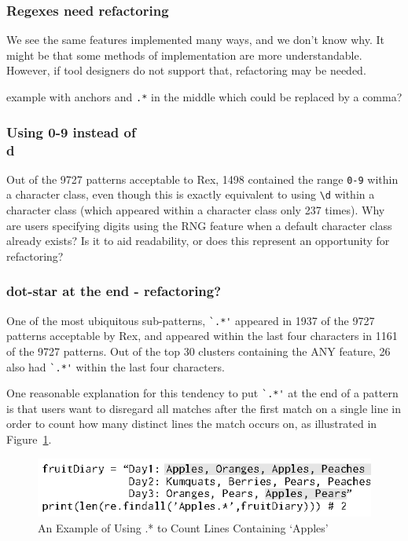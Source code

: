 \subsubsection{Regexes need refactoring}
We see the same features implemented many ways, and we don't know why. It might be that some methods of implementation are more understandable. However, if tool designers do not support that, refactoring may be needed.

example with anchors and {\tt .*} in the middle which could be replaced by a comma?

\subsubsection{Using 0-9 instead of \\d}
Out of the 9727 patterns acceptable to Rex, 1498 contained the range \verb•0-9• within a character class, even though this is exactly equivalent to using \verb•\d• within a character class (which appeared within a character class only 237 times).  Why are users specifying digits using the RNG feature when a default character class already exists?  Is it to aid readability, or does this represent an opportunity for refactoring?

\subsubsection{dot-star at the end - refactoring?}
One of the most ubiquitous sub-patterns, \verb!`.*'! appeared in 1937 of the 9727 patterns acceptable by Rex, and appeared within the last four characters in 1161 of the 9727 patterns.  Out of the top 30 clusters containing the ANY feature, 26 also had \verb!`.*'! within the last four characters.

One reasonable explanation for this tendency to put \verb!`.*'! at the end of a pattern is that users want to disregard all matches after the first match on a single line in order to count how many distinct lines the match occurs on, as illustrated in Figure~\ref{fig:lineSearch}.

\begin{figure}[htb]
\centering
\includegraphics[width=\columnwidth]{../illustrations/lineSearch.eps}
\caption{An Example of Using .* to Count Lines Containing `Apples'}
\label{fig:lineSearch}
\end{figure}

